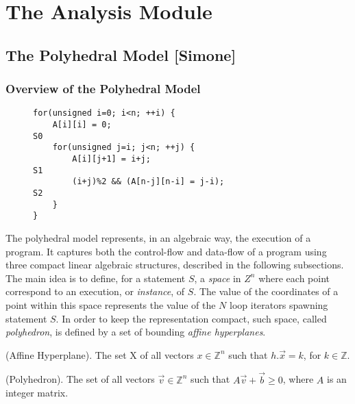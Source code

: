 \chapter{The Analysis Module}

\section{The Polyhedral Model [Simone]}
\label{insieme:analysis:polyhedral}

\subsection{Overview of the Polyhedral Model}

\begin{figure}[t]
\small
\begin{lstlisting}[caption=Running example]
for(unsigned i=0; i<n; ++i) {
	A[i][i] = 0;												S0
	for(unsigned j=i; j<n; ++j) { 
		A[i][j+1] = i+j;				 					    S1
		(i+j)%2 && (A[n-j][n-i] = j-i);	         		        S2
	}
}
\end{lstlisting}
\label{list:1}
\end{figure}

The polyhedral model represents, in an algebraic way, the execution of a
program.  It captures both the control-flow and data-flow of a program using
three compact linear algebraic structures, described in the following
subsections. The main idea is to define, for a statement $S$, a \emph{space} in
$Z^n$ where each point correspond to an execution, or \emph{instance}, of $S$.
The value of the coordinates of a point within this space represents the value of
the $N$ loop iterators spawning statement $S$.  In order to keep the
representation compact, such space, called \emph{polyhedron}, is defined by a
set of bounding \emph{affine hyperplanes}.

\begin{definition}
\label{def:1}
(Affine Hyperplane). The set X of all vectors $x \in \mathbb{Z}^n$ such that $h.\vec{x} =
k$, for $k \in \mathbb{Z}$.
\end{definition}

\begin{definition}
\label{def:2}
(Polyhedron). The set of all vectors $\vec{v} \in \mathbb{Z}^n$ such that $A \vec{v} +
\vec{b} \ge 0$, where $A$ is an integer matrix.
\end{definition}

